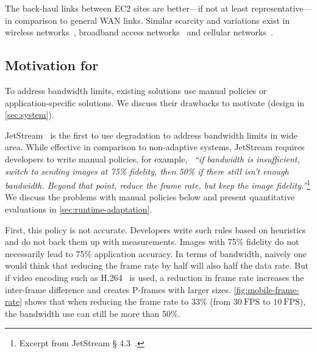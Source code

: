 The back-haul links between EC2 sites are better---if not at least
representative---in comparison to general WAN links. Similar scarcity and
variations exist in wireless networks~\cite{biswas2015large}, broadband access
networks~\cite{grover2013peeking, sundaresan2014bismark} and cellular
networks~\cite{nikravesh2014mobile}.

\subsection{Motivation for \awstream{}}
\label{subsec:motivation}




To address bandwidth limits, existing solutions use manual policies or
application-specific solutions. We discuss their drawbacks to motivate
\awstream{} (design in \autoref{sec:system}).

 JetStream~\cite{rabkin2014aggregation} is
the first to use degradation to address bandwidth limits in wide area. While
effective in comparison to non-adaptive systems, JetStream requires developers
to write manual policies, for example, ~\textit{``if bandwidth is insufficient,
  switch to sending images at 75\% fidelity, then 50\% if there still isn't
  enough bandwidth. Beyond that point, reduce the frame rate, but keep the image
  fidelity.''}\footnote{Excerpt from JetStream \S
  4.3~\cite{rabkin2014aggregation}.} We discuss the problems with manual
policies below and present quantitative evaluations in
\autoref{sec:runtime-adaptation}.

First, this policy is not accurate.  Developers write such rules based on
heuristics and do not back them up with measurements. Images with 75\% fidelity
do not necessarily lead to 75\% application accuracy. In terms of bandwidth,
naively one would think that reducing the frame rate by half will also half the
data rate. But if video encoding such as H.264~\cite{richardson2011h} is used, a
reduction in frame rate increases the inter-frame difference and creates
P-frames with larger sizes. \autoref{fig:mobile-frame-rate} shows that when
reducing the frame rate to 33\% (from \(30~\text{FPS}\) to \(10~\text{FPS}\)),
the bandwidth use can still be more than 50\%.

